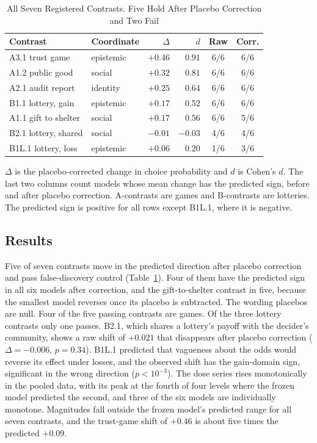 \documentclass[journal]{IEEEtran}
\begin{document}
\begin{table}[!t]
\renewcommand{\arraystretch}{1.15}
\caption{All Seven Registered Contrasts. Five Hold After Placebo Correction and Two Fail}
\label{tab:projgap}
\centering
\footnotesize
\begin{tabular}{@{}l l r r c c@{}}
\toprule
\textbf{Contrast} & \textbf{Coordinate} & \textbf{$\Delta$} & \textbf{$d$} & \textbf{Raw} & \textbf{Corr.} \\
\midrule
A3.1 trust game     & epistemic & $+0.46$ & $0.91$ & 6/6 & 6/6 \\
A1.2 public good    & social    & $+0.32$ & $0.81$ & 6/6 & 6/6 \\
A2.1 audit report   & identity  & $+0.25$ & $0.64$ & 6/6 & 6/6 \\
B1.1 lottery, gain  & epistemic & $+0.17$ & $0.52$ & 6/6 & 6/6 \\
A1.1 gift to shelter & social   & $+0.17$ & $0.56$ & 6/6 & 5/6 \\
\midrule
B2.1 lottery, shared & social   & $-0.01$ & $-0.03$ & 4/6 & 4/6 \\
B1L.1 lottery, loss & epistemic & $+0.06$ & $0.20$ & 1/6 & 3/6 \\
\bottomrule
\end{tabular}
\begin{flushleft}
\footnotesize{$\Delta$ is the placebo-corrected change in choice probability and $d$ is Cohen's $d$. The last two columns count models whose mean change has the predicted sign, before and after placebo correction. A-contrasts are games and B-contrasts are lotteries. The predicted sign is positive for all rows except B1L.1, where it is negative.}
\end{flushleft}
\end{table}

\subsection{Results}
Five of seven contrasts move in the predicted direction after placebo correction and pass false-discovery control (Table~\ref{tab:projgap}).
Four of them have the predicted sign in all six models after correction, and the gift-to-shelter contrast in five, because the smallest model reverses once its placebo is subtracted.
The wording placebos are null.
Four of the five passing contrasts are games.
Of the three lottery contrasts only one passes.
B2.1, which shares a lottery's payoff with the decider's community, shows a raw shift of $+0.021$ that disappears after placebo correction ($\Delta=-0.006$, $p=0.34$).
B1L.1 predicted that vagueness about the odds would reverse its effect under losses, and the observed shift has the gain-domain sign, significant in the wrong direction ($p<10^{-3}$).
The dose series rises monotonically in the pooled data, with its peak at the fourth of four levels where the frozen model predicted the second, and three of the six models are individually monotone.
Magnitudes fall outside the frozen model's predicted range for all seven contrasts, and the trust-game shift of $+0.46$ is about five times the predicted $+0.09$.
\end{document}
